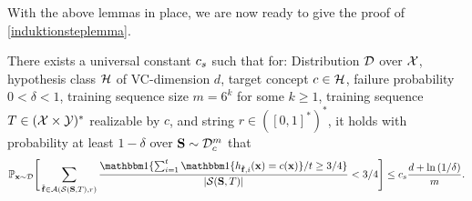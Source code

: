 \lemmaadaboostsampleeasyproperties*

With the above lemmas in place, we are now ready to give the proof of \cref{induktionsteplemma}.
\begin{theorem}\label{induktionsteplemma}
 There exists a universal constant $c_s$ such that for: Distribution $ \mathcal{D} $ over $ \mathcal{X} $, hypothesis class $ \mathcal{H} $ of VC-dimension $ d $, target concept $ c\in \mathcal{H} $,  failure probability $ 0<\delta<1 $, training sequence size $m=6^{k}$ for some $k\geq 1$, training sequence $T\in (\mathcal{X}\times \mathcal{Y})^{*}$ realizable by $ c $, and string $r\in ([0,1]^{*})^{*}$, it holds with probability at least $1-\delta$ over $\mathbf{S}\sim \mathcal{D}_{c}^{m}$ that 
  \begin{align*}
    \p_{\rx\sim \cD} \Bigg[  
      \sum_{\rf\in \cA(\cS(\rS,T),r)} \frac{\ind\{\sum_{i=1}^{t} \ind\{h_{\rf,i}(\rx)=c(\rx)\}/t\geq 3/4\}}{|\cS(\rS,T)|}
       <3/4\Bigg] \leq \cs \frac{d+\ln{\left(1/\delta \right)}}{m}.
  \end{align*}
\end{theorem}

